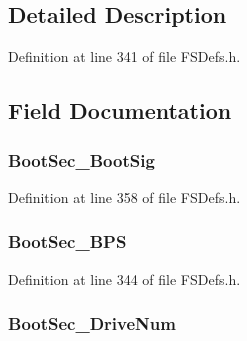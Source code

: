 \subsection{Detailed Description}


Definition at line 341 of file F\+S\+Defs.\+h.



\subsection{Field Documentation}
\hypertarget{struct___b_p_b___f_a_t16_a71da1da2548ac5984ace7ab86665b290}{}
\subsubsection[{Boot\+Sec\+\_\+\+Boot\+Sig}]{ Boot\+Sec\+\_\+\+Boot\+Sig}\label{struct___b_p_b___f_a_t16_a71da1da2548ac5984ace7ab86665b290}


Definition at line 358 of file F\+S\+Defs.\+h.

\hypertarget{struct___b_p_b___f_a_t16_ad659c9ffa17932287cef58634e94b709}{}
\subsubsection[{Boot\+Sec\+\_\+\+B\+P\+S}]{ Boot\+Sec\+\_\+\+B\+P\+S}\label{struct___b_p_b___f_a_t16_ad659c9ffa17932287cef58634e94b709}


Definition at line 344 of file F\+S\+Defs.\+h.

\hypertarget{struct___b_p_b___f_a_t16_a1a90c05e47ba9e37788e1a31b36f6ce9}{}
\subsubsection[{Boot\+Sec\+\_\+\+Drive\+Num}]{ Boot\+Sec\+\_\+\+Drive\+Num}\label{struct___b_p_b___f_a_t16_a1a90c05e47ba9e37788e1a31b36f6ce9}


